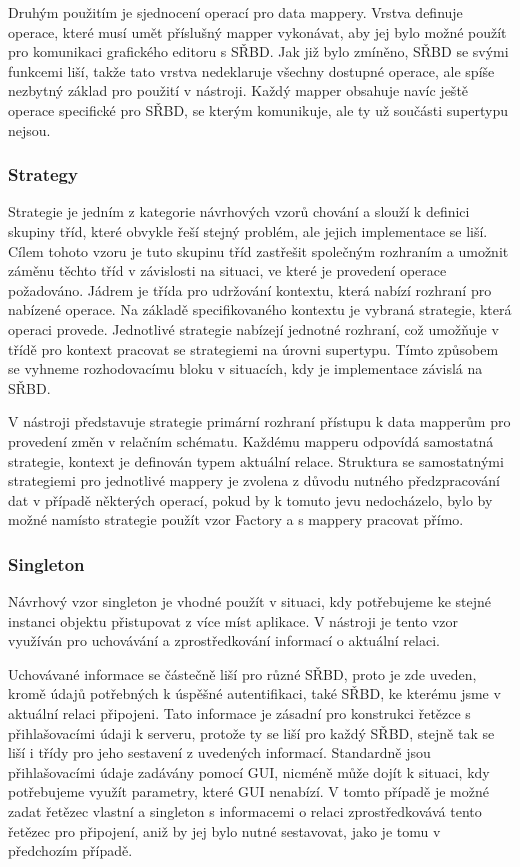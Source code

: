 \documentclass[czech,bachelor,public,dept460,male,oneside]{diploma}
\begin{document}
		Druhým použitím je sjednocení operací pro data mappery. Vrstva definuje operace, které musí umět příslušný mapper vykonávat, aby jej bylo možné použít pro komunikaci grafického editoru s SŘBD. Jak již bylo zmíněno, SŘBD se svými funkcemi liší, takže tato vrstva nedeklaruje všechny dostupné operace, ale spíše nezbytný základ pro použití v nástroji. Každý mapper obsahuje navíc ještě operace specifické pro SŘBD, se kterým komunikuje, ale ty už součásti supertypu nejsou.
	
		\subsubsection{Strategy} \label{secStrategy}
		Strategie je jedním z kategorie návrhových vzorů chování a slouží k definici skupiny tříd, které obvykle řeší stejný problém, ale jejich implementace se liší. Cílem tohoto vzoru je tuto skupinu tříd zastřešit společným rozhraním a umožnit záměnu těchto tříd v závislosti na situaci, ve které je provedení operace požadováno. Jádrem je třída pro udržování kontextu, která nabízí rozhraní pro nabízené operace. Na základě specifikovaného kontextu je vybraná strategie, která operaci provede. Jednotlivé strategie nabízejí jednotné rozhraní, což umožňuje v třídě pro kontext pracovat se strategiemi na úrovni supertypu. Tímto způsobem se vyhneme rozhodovacímu bloku v situacích, kdy je implementace závislá na SŘBD.
		
		V nástroji představuje strategie primární rozhraní přístupu k data mapperům pro provedení změn v relačním schématu. Každému mapperu odpovídá samostatná strategie, kontext je definován typem aktuální relace. Struktura se samostatnými strategiemi pro jednotlivé mappery je zvolena z důvodu nutného předzpracování dat v případě některých operací, pokud by k tomuto jevu nedocházelo, bylo by možné namísto strategie použít vzor Factory a s mappery pracovat přímo. 
		
		\subsubsection{Singleton}
		Návrhový vzor singleton je vhodné použít v situaci, kdy potřebujeme ke stejné instanci objektu přistupovat z více míst aplikace. V nástroji je tento vzor využíván pro uchovávání a zprostředkování informací o aktuální relaci. 
		
		Uchovávané informace se částečně liší pro různé SŘBD, proto je zde uveden, kromě údajů potřebných k úspěšné autentifikaci, také SŘBD, ke kterému jsme v aktuální relaci připojeni. Tato informace je zásadní pro konstrukci řetězce s přihlašovacími údaji k serveru, protože ty se liší pro každý SŘBD, stejně tak se liší i třídy pro jeho sestavení z uvedených informací. Standardně jsou přihlašovacími údaje zadávány pomocí GUI, nicméně může dojít k situaci, kdy potřebujeme využít parametry, které GUI nenabízí. V tomto případě je možné zadat řetězec vlastní a singleton s informacemi o relaci zprostředkovává tento řetězec pro připojení, aniž by jej bylo nutné sestavovat, jako je tomu v předchozím případě.
	
\end{document}
